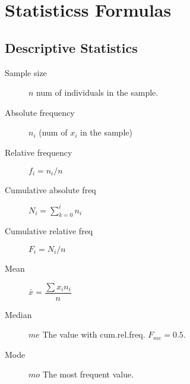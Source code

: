 
\sloppy

\section*{Statisticss Formulas}

\footnotesize
{}

\begin{multicols*}{2}

	\subsection*{Descriptive Statistics}

	\begin{tcolorbox}[hbox, title=Frequencies]
		\begin{minipage}{0.4\textwidth}
			\begin{description}
				\item [Sample size] $n$ num of individuals in the sample.
			\end{description}
			\begin{description}
				\item [Absolute frequency] $n_i$ (num of $x_i$ in the sample)
				\item [Relative frequency] $f_i=n_i/n$
				\item [Cumulative absolute freq] $N_i=\sum_{k=0}^in_i$
				\item [Cumulative relative freq] $F_i=N_i/n$
			\end{description}
		\end{minipage}
	\end{tcolorbox}

	\begin{tcolorbox}[hbox, title=Central tendency statistics]
		\begin{minipage}{0.4\textwidth}
			\begin{description}
				\item [Mean] $\bar{x}=\dfrac{\sum x_in_i}{n}$
				\item [Median] $me$ The value with cum.rel.freq. $F_{me}=0.5$.
				\item [Mode] $mo$ The most frequent value.
			\end{description}
		\end{minipage}
	\end{tcolorbox}


\end{multicols*}
